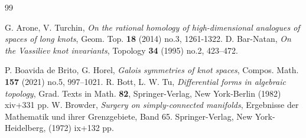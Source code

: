 \documentclass[reqno]{amsart}
\theoremstyle{definition}
\theoremstyle{plain}
\begin{document}
\begin{thebibliography}{99}

 G. Arone,   V. Turchin, {\em On the rational homology of high-dimensional analogues of spaces of long knots}, Geom.  Top. {\bf 18} (2014)  no.3, 1261-1322.
 D. Bar-Natan, {\em On the Vassiliev knot invariants}, Topology 
{\bf 34} (1995) no.2, 423–472.

 P. Boavida de Brito, G. Horel, 
{\em Galois symmetries of knot spaces}, Compos. Math. {\bf 157} (2021) no.5, 997–1021.
 R. Bott, L. W. Tu, {\em Differential forms in algebraic topology}, 
Grad. Texts in Math. {\bf 82},  Springer-Verlag, New York-Berlin (1982)
  xiv+331 pp.
 W. Browder, {\em Surgery on simply-connected manifolds}, Ergebnisse der Mathematik und ihrer Grenzgebiete, Band 65. Springer-Verlag, New York-Heidelberg, (1972) ix+132 pp. 


\end{thebibliography}
\end{document}
